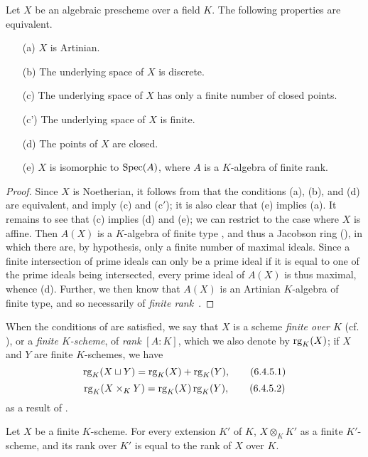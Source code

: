 \begin{proposition}[6.4.4]
\label{I.6.4.4}
Let $X$ be an algebraic prescheme over a field $K$.
The following properties are equivalent.
\begin{enumerate}
  \item[{\rm(a)}] $X$ is Artinian.
  \item[{\rm(b)}] The underlying space of $X$ is discrete.
  \item[{\rm(c)}] The underlying space of $X$ has only a finite number of closed points.
  \item[{\rm(c')}] The underlying space of $X$ is finite.
  \item[{\rm(d)}] The points of $X$ are closed.
  \item[{\rm(e)}] $X$ is isomorphic to $\operatorname{Spec}(A)$, where $A$ is a $K$-algebra of finite rank.
\end{enumerate}
\end{proposition}

\begin{proof}
\label{proof-1.6.4.4}
Since $X$ is Noetherian, it follows from  that the conditions (a), (b), and (d) are equivalent, and imply (c) and (c$'$);
it is also clear that (e) implies (a).
It remains to see that (c) implies (d) and (e);
we can restrict to the case where $X$ is affine.
Then $A(X)$ is a $K$-algebra of finite type , and thus a Jacobson ring (\cite[p.~3-11 and 3-12]{I-1}), in which there are, by hypothesis, only a finite number of maximal ideals.
Since a finite intersection of prime ideals can only be a prime ideal if it is equal to one of the prime ideals being intersected, every prime ideal of $A(X)$ is thus maximal, whence (d).
Further, we then know  that $A(X)$ is an Artinian $K$-algebra of finite type, and so necessarily of \emph{finite rank}~\cite{I-21}.
\end{proof}

\begin{env}[6.4.5]
\label{I.6.4.5}
When the conditions of  are satisfied, we say that $X$ is a scheme \emph{finite over $K$} (cf. ), or a \emph{finite $K$-scheme}, of \emph{rank} $[A:K]$, which we also denote by $\operatorname{rg}_K(X)$;
if $X$ and $Y$ are finite $K$-schemes, we have
\[
  \operatorname{rg}_K(X\sqcup Y)=\operatorname{rg}_K(X)+\operatorname{rg}_K(Y),
  \tag{6.4.5.1}
\]
\[
  \operatorname{rg}_K(X\times_K Y)=\operatorname{rg}_K(X)\operatorname{rg}_K(Y),
  \tag{6.4.5.2}
\]
as a result of .
\end{env}

\begin{corollary}[6.4.6]
\label{I.6.4.6}
Let $X$ be a finite $K$-scheme.
For every extension $K'$ of $K$, $X\otimes_K K'$ as a finite $K'$-scheme, and its rank over $K'$ is equal to the rank of $X$ over $K$.
\end{corollary}

